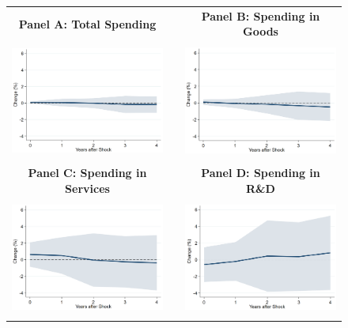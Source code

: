 \documentclass[dv_diss_main.tex]{subfiles}
\begin{document}
\begin{figure}[ht]
    \begin{center}
        \begin{tabular}[c]{ccc}
    
    \normalsize{\bf Panel A: Total Spending} & & \normalsize{\bf Panel B: Spending in Goods} \\
    {\includegraphics[height=1.5in,width=2.8in]{figures/graph_Rn_consexp_lv_Rn_ms_lv.png}} & & {\includegraphics[height=1.5in,width=2.8in]{figures/graph_Rn_consexp_lv_Rn_ms_goods_lv.png}} \\[0.1in]
    
    \normalsize{\bf Panel C: Spending in Services} & & \normalsize{\bf Panel D: Spending in R\&D} \\
    {\includegraphics[height=1.5in,width=2.8in]{figures/graph_Rn_consexp_lv_Rn_ms_services_lv.png}} & & {\includegraphics[height=1.5in,width=2.8in]{figures/graph_Rn_consexp_lv_Rn_ms_rd_lv.png}} \\[0.1in]


\end{tabular}
\end{center}
\end{figure}
\end{document}
